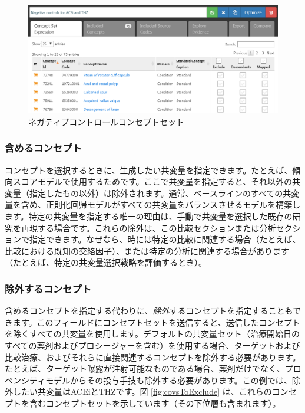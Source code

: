 \documentclass[
  11pt]{book}
\theoremstyle{definition}
\theoremstyle{definition}
\theoremstyle{definition}
\theoremstyle{definition}
\theoremstyle{remark}
\begin{document}
\begin{figure}

{\centering \includegraphics[width=1\linewidth]{images/PopulationLevelEstimation/ncConceptSet} 

}

\caption{ネガティブコントロールコンセプトセット}\label{fig:ncConceptSet}
\end{figure}

\subsubsection*{含めるコンセプト}\label{ux542bux3081ux308bux30b3ux30f3ux30bbux30d7ux30c8}

コンセプトを選択するときに、生成したい共変量を指定できます。たとえば、傾向スコアモデルで使用するためです。ここで共変量を指定すると、それ以外の共変量（指定したもの以外）は除外されます。通常、ベースラインのすべての共変量を含め、正則化回帰モデルがすべての共変量をバランスさせるモデルを構築します。特定の共変量を指定する唯一の理由は、手動で共変量を選択した既存の研究を再現する場合です。これらの除外は、この比較セクションまたは分析セクションで指定できます。なぜなら、時には特定の比較に関連する場合（たとえば、比較における既知の交絡因子）、または特定の分析に関連する場合があります（たとえば、特定の共変量選択戦略を評価するとき）。

\subsubsection*{除外するコンセプト}\label{ux9664ux5916ux3059ux308bux30b3ux30f3ux30bbux30d7ux30c8}

含めるコンセプトを指定する代わりに、\emph{除外}するコンセプトを指定することもできます。このフィールドにコンセプトセットを送信すると、送信したコンセプトを除くすべての共変量を使用します。デフォルトの共変量セット（治療開始日のすべての薬剤およびプロシージャーを含む）を使用する場合、ターゲットおよび比較治療、およびそれらに直接関連するコンセプトを除外する必要があります。たとえば、ターゲット曝露が注射可能なものである場合、薬剤だけでなく、プロペンシティモデルからその投与手技も除外する必要があります。この例では、除外したい共変量はACEiとTHZです。図 \ref{fig:covsToExclude} は、これらのコンセプトを含むコンセプトセットを示しています（その下位層も含まれます）。
\end{document}
